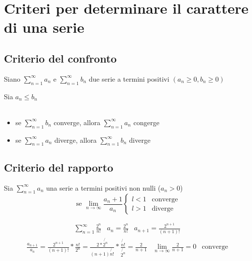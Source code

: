 \section{Criteri per determinare il carattere di una serie}
\subsection{Criterio del confronto}
Siano $\displaystyle\sum_{n=1}^\infty a_n$ e $\displaystyle\sum_{n=1}^\infty b_n$ due serie a termini positivi $(a_n\geq 0, b_n\geq 0)$
\begin{multicols}{2}
  Sia $a_n\leq b_n$\\\\
  \begin{itemize}
  \item se $\displaystyle\sum_{n=1}^\infty b_n$ converge, allora $\displaystyle\sum_{n=1}^\infty a_n$ congerge
    \item se $\displaystyle\sum_{n=1}^\infty a_n$ diverge, allora $\displaystyle\sum_{n=1}^\infty b_n$ diverge 
  \end{itemize} 
\end{multicols}
\subsection{Criterio del rapporto}
Sia $\sum_{n=1}^\infty a_n$ una serie a termini positivi non nulli ($a_n>0$)
\begin{equation*}
  \text{ se } \lim_{n\to \infty} \frac{a_n+1}{a_n}\begin{cases}
                                                    l<1 & \text{converge}\\
                                                    l>1 & \text{diverge}
                                                  \end{cases}
\end{equation*}
\clearpage
\begin{esempio}
  \begin{eqnarray*}
    \displaystyle\sum_{n=1}^{\infty}\frac{2^n}{n!} & a_n=\frac{2^n}{n!} & a_{n+1}=\frac{2^{n+1}}{(n+1)!} 
  \end{eqnarray*}
  \begin{eqnarray*}
    \frac{a_{n+1}}{a_n}=\frac{2^{n+1}}{(n+1)!}*\frac{n!}{2^n}
    =\frac{2*\not{2^n}}{(n+1)\not{n!}}*\frac{\not{n!}}{\not{2^n}}=\frac{2}{n+1}
    & \lim_{n\to \infty} \frac{2}{n+1} = 0 & \text{converge}
  \end{eqnarray*} 
\end{esempio}
